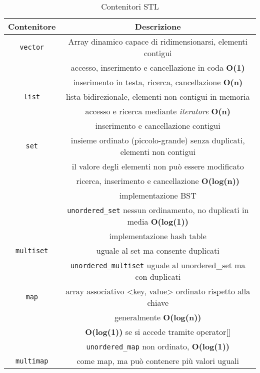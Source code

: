 \begin{table}[h]
    \centering
    \begin{tabular}{c|c}
    \hline
            Contenitore&Descrizione\\
    \hline
         \verb|vector|  &  Array dinamico capace di ridimensionarsi, elementi contigui\\
                        & accesso, inserimento e cancellazione in coda \textbf{O(1)}\\
                        & inserimento in testa, ricerca, cancellazione \textbf{O(n)} \\
    \hline
         \verb|list|    & lista bidirezionale, elementi non contigui in memoria \\                         
                        & accesso e ricerca mediante \textit{iteratore} \textbf{O(n)} \\
                        & inserimento e cancellazione  contigui\\
    \hline\hline
         \verb|set| & insieme ordinato (piccolo-grande) senza duplicati, elementi non contigui\\
                    & il valore degli elementi non può essere modificato\\
                    & ricerca, inserimento e cancellazione \textbf{O(log(n))}\\
                    &implementazione BST\\
                    &\verb|unordered_set| nessun ordinamento, no duplicati in media \textbf{O(log(1))}\\
                    &implementazione hash table\\
                    \hline
         \verb|multiset|& uguale al set ma consente duplicati\\
                        &\verb|unordered_multiset| uguale al unordered\_set ma con duplicati \\
                    \hline
         \verb|map| & array associativo <key, value> ordinato rispetto alla chiave \\
                    & generalmente \textbf{O(log(n))}\\
                    &\textbf{O(log(1))} se si accede tramite operator[]\\
                    &\verb|unordered_map| non ordinato, \textbf{O(log(1))} \\
                    \hline
         \verb|multimap|& come map, ma può contenere più valori uguali \\
                
    \end{tabular}
    \caption{Contenitori STL}
    \label{tab:my_label}
\end{table}


